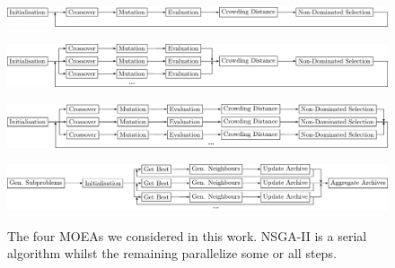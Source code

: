 \begin{figure}[t]
    \begin{minipage}{\textwidth}
        \centering
        \includegraphics[width=\textwidth]{figures/algorithms/nsgaii}
        \label{fig:nsgaii}
    \end{minipage}
    \vspace{2.5em}

    \begin{minipage}{\textwidth}
        \centering
        \includegraphics[width=\textwidth]{figures/algorithms/msnsgaii}
        \label{fig:msnsgaii}
    \end{minipage}
    \vspace{2.5em}

    \begin{minipage}{\textwidth}
        \centering
        \includegraphics[width=\textwidth]{figures/algorithms/mdnsgaii}
        \label{fig:mdnsgaii}
    \end{minipage}
    \vspace{2.5em}

    \begin{minipage}{\textwidth}
        \centering
        \includegraphics[width=\textwidth]{figures/algorithms/ppls}
        \label{fig:pplsd}
    \end{minipage}

    \vspace{1em}
    \caption{The four MOEAs we considered in this work. NSGA-II is a serial algorithm whilst the remaining parallelize some or all steps.}
    \label{fig:algorithms}
\end{figure}

